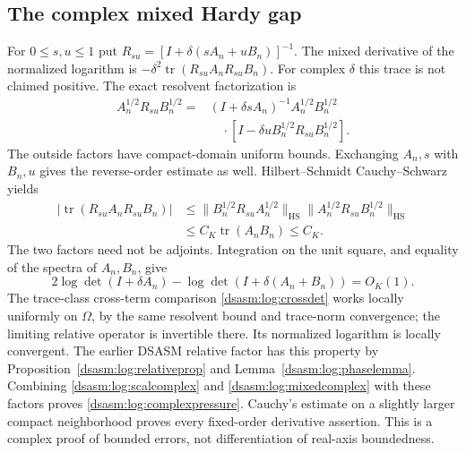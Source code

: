 \documentclass[11pt,letterpaper]{article}
\theoremstyle{remark}\newtheorem{remark}[theorem]{Remark}
\newcommand{\HS}{\mathrm{HS}}
\DeclareMathOperator{\tr}{tr}\DeclareMathOperator{\Ran}{Ran}
\begin{document}
\subsection{The complex mixed Hardy gap}
For $0\le s,u\le1$ put
$R_{su}=[I+\delta(sA_n+uB_n)]^{-1}$. The mixed derivative of the
normalized logarithm is
$-\delta^2\tr(R_{su}A_nR_{su}B_n)$. For complex $\delta$ this
trace is not claimed positive. The exact resolvent factorization is
\begin{align*}
 A_n^{1/2}R_{su}B_n^{1/2}
 ={}&(I+\delta sA_n)^{-1}A_n^{1/2}B_n^{1/2}\\
 &\quad\cdot[I-\delta uB_n^{1/2}R_{su}B_n^{1/2}].
\end{align*}
The outside factors have compact-domain uniform bounds. Exchanging
$A_n,s$ with $B_n,u$ gives the reverse-order estimate as well.
Hilbert--Schmidt Cauchy--Schwarz yields
\begin{align*}
 |\tr(R_{su}A_nR_{su}B_n)|
 &\le\|B_n^{1/2}R_{su}A_n^{1/2}\|_\HS
        \|A_n^{1/2}R_{su}B_n^{1/2}\|_\HS\\
 &\le C_K\tr(A_nB_n)\le C_K.
\end{align*}
The two factors need not be adjoints. Integration on the unit square,
and equality of the spectra of $A_n,B_n$, give
\begin{equation}\label{dsasm:log:mixedcomplex}
 2\log\det(I+\delta A_n)
          -\log\det(I+\delta(A_n+B_n))=O_K(1).
\end{equation}
The trace-class cross-term comparison \eqref{dsasm:log:crossdet} works locally
uniformly on $\Omega$, by the same resolvent bound and trace-norm
convergence; the limiting relative operator is invertible there.
Its normalized logarithm is locally convergent. The earlier DSASM
relative factor has this property by Proposition~\ref{dsasm:log:relativeprop}
and Lemma~\ref{dsasm:log:phaselemma}. Combining \eqref{dsasm:log:scalcomplex} and
\eqref{dsasm:log:mixedcomplex} with these factors proves
\eqref{dsasm:log:complexpressure}. Cauchy's estimate on a slightly larger
compact neighborhood proves every fixed-order derivative assertion.
This is a complex proof of bounded errors, not differentiation of
real-axis boundedness.
\end{document}
